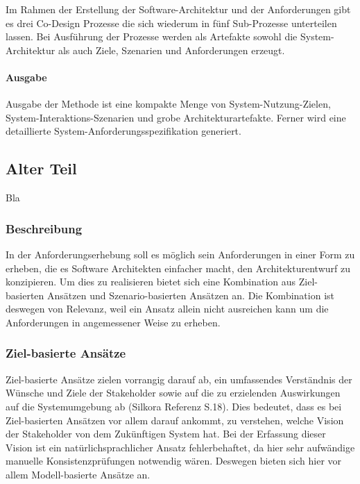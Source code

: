 Im Rahmen der Erstellung der Software-Architektur und der Anforderungen gibt es drei Co-Design Prozesse die sich wiederum in fünf Sub-Prozesse unterteilen lassen. Bei Ausführung der Prozesse werden als Artefakte sowohl die System-Architektur als auch Ziele, Szenarien und Anforderungen erzeugt. \\

\paragraph{Ausgabe}
Ausgabe der Methode ist eine kompakte Menge von System-Nutzung-Zielen, System-Interaktions-Szenarien und grobe Architekturartefakte. Ferner wird eine detaillierte System-Anforderungsspezifikation generiert.\\


\subsection{Alter Teil}
Bla\\

\subsubsection{Beschreibung}
In der Anforderungserhebung soll es m\"oglich sein Anforderungen in einer Form zu erheben, die es Software Architekten einfacher macht, den Architekturentwurf zu konzipieren. Um dies zu realisieren bietet sich eine Kombination aus Ziel-basierten Ans\"atzen und Szenario-basierten Ans\"atzen an. Die Kombination ist deswegen von Relevanz, weil ein Ansatz allein nicht ausreichen kann um die Anforderungen in angemessener Weise zu erheben.\\

\subsubsection{Ziel-basierte Ans\"atze}
Ziel-basierte Ans\"atze zielen vorrangig darauf ab, ein umfassendes Verst\"andnis der W\"unsche und Ziele der Stakeholder sowie auf die zu erzielenden Auswirkungen auf die Systemumgebung ab (Silkora Referenz S.18). Dies bedeutet, dass es bei Ziel-basierten Ans\"atzen vor allem darauf ankommt, zu verstehen, welche Vision der Stakeholder von dem Zuk\"unftigen System hat. Bei der Erfassung dieser Vision ist ein nat\"urlichsprachlicher Ansatz fehlerbehaftet, da hier sehr aufw\"andige manuelle Konsistenzpr\"ufungen notwendig w\"aren. Deswegen bieten sich hier vor allem Modell-basierte Ans\"atze an.\\

